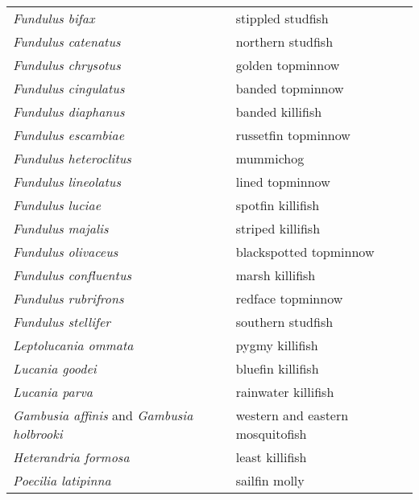 \documentclass[11pt]{article}
\begin{document}
\vspace{\baselineskip}

%
\textbf{\Student}

\begin{tabular}{@{}L{3in}L{3in}@{}}
\textit{Fundulus bifax} &   stippled studfish\tabularnewline
\textit{Fundulus catenatus} &   northern studfish\tabularnewline
\textit{Fundulus chrysotus} &   golden topminnow\tabularnewline
\textit{Fundulus cingulatus} &   banded topminnow\tabularnewline
\textit{Fundulus diaphanus} &   banded killifish\tabularnewline
\textit{Fundulus escambiae} &   russetfin topminnow\tabularnewline
\textit{Fundulus heteroclitus} &   mummichog\tabularnewline
\textit{Fundulus lineolatus} &   lined topminnow\tabularnewline
\textit{Fundulus luciae} &   spotfin killifish\tabularnewline
\textit{Fundulus majalis} &   striped killifish\tabularnewline
\textit{Fundulus olivaceus} &   blackspotted topminnow\tabularnewline
\textit{Fundulus confluentus} &   marsh killifish\tabularnewline
\textit{Fundulus rubrifrons} &   redface topminnow\tabularnewline
\textit{Fundulus stellifer} &   southern studfish\tabularnewline
\textit{Leptolucania ommata} &   pygmy killifish\tabularnewline
\textit{Lucania goodei} &   bluefin killifish\tabularnewline
\textit{Lucania parva} &   rainwater killifish\tabularnewline
\textit{Gambusia affinis} and \textit{Gambusia holbrooki} &   western and eastern mosquitofish\tabularnewline
\textit{Heterandria formosa} &   least killifish\tabularnewline
\textit{Poecilia latipinna} &   sailfin molly\tabularnewline
\end{tabular}

\newpage

\vspace{\baselineskip}

%
\textbf{\Student}
\end{document}
